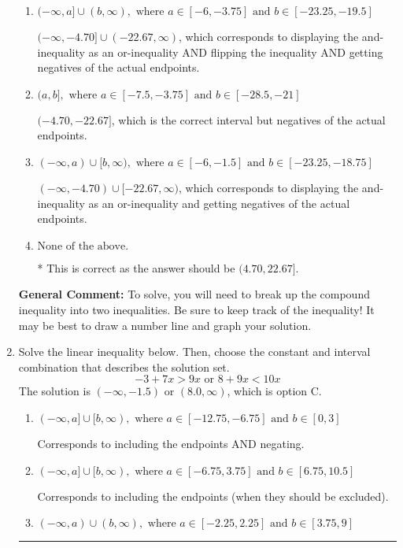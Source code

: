 \documentclass{extbook}[14pt]
\newcommand{\litem}[1]{\item #1

\rule{\textwidth}{0.4pt}}
\begin{document}
\begin{enumerate}
{\begin{enumerate}[label=\Alph*.]
$[-4.70, -22.67)$, which corresponds to flipping the inequality and getting negatives of the actual endpoints.
\item \( (-\infty, a] \cup (b, \infty), \text{ where } a \in [-6, -3.75] \text{ and } b \in [-23.25, -19.5] \)

$(-\infty, -4.70] \cup (-22.67, \infty)$, which corresponds to displaying the and-inequality as an or-inequality AND flipping the inequality AND getting negatives of the actual endpoints.
\item \( (a, b], \text{ where } a \in [-7.5, -3.75] \text{ and } b \in [-28.5, -21] \)

$(-4.70, -22.67]$, which is the correct interval but negatives of the actual endpoints.
\item \( (-\infty, a) \cup [b, \infty), \text{ where } a \in [-6, -1.5] \text{ and } b \in [-23.25, -18.75] \)

$(-\infty, -4.70) \cup [-22.67, \infty)$, which corresponds to displaying the and-inequality as an or-inequality and getting negatives of the actual endpoints.
\item \( \text{None of the above.} \)

* This is correct as the answer should be $(4.70, 22.67]$.
\end{enumerate}

\textbf{General Comment:} To solve, you will need to break up the compound inequality into two inequalities. Be sure to keep track of the inequality! It may be best to draw a number line and graph your solution.
}
\litem{
Solve the linear inequality below. Then, choose the constant and interval combination that describes the solution set.
\[ -3 + 7 x > 9 x \text{ or } 8 + 9 x < 10 x \]The solution is \( (-\infty, -1.5) \text{ or } (8.0, \infty) \), which is option C.\begin{enumerate}[label=\Alph*.]
\item \( (-\infty, a] \cup [b, \infty), \text{ where } a \in [-12.75, -6.75] \text{ and } b \in [0, 3] \)

Corresponds to including the endpoints AND negating.
\item \( (-\infty, a] \cup [b, \infty), \text{ where } a \in [-6.75, 3.75] \text{ and } b \in [6.75, 10.5] \)

Corresponds to including the endpoints (when they should be excluded).
\item \( (-\infty, a) \cup (b, \infty), \text{ where } a \in [-2.25, 2.25] \text{ and } b \in [3.75, 9] \)


\end{enumerate}}
\end{enumerate}
\end{document}

